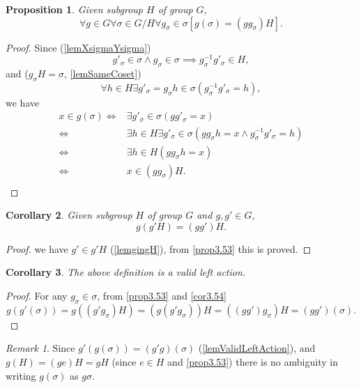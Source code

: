 \documentclass[12pt, letterpaper]{article}
\newtheorem{prop}{Proposition}[section]
\newtheorem{cor}[prop]{Corollary}
\theoremstyle{definition}
\theoremstyle{remark}
\newtheorem*{rem*}{Remark}
\theoremstyle{definition}
\theoremstyle{plain}
\numberwithin{equation}{section}
\begin{document}
	\begin{prop}\label{prop3.53}
		Given subgroup $H$ of group $G$,
		\[\forall g\in G\forall \sigma \in G/H\forall g_\sigma\in\sigma[ g(\sigma)= (gg_{\sigma})H].\]
	\end{prop}
	\begin{proof}
		Since (\autoref{lemXsigmaYsigma})
		\[g'_\sigma\in\sigma\land g_\sigma\in\sigma \implies g_\sigma^{-1}g'_\sigma\in H, \]
		and ($g_\sigma H=\sigma$, \autoref{lemSameCoset})
		\[ \forall h \in H \exists g'_\sigma=g_\sigma h\in \sigma (g^{-1}_\sigma g'_\sigma=h),\]
		we have
		\[\begin{aligned}
			x\in g(\sigma)\iff &\exists g'_\sigma\in\sigma(gg'_\sigma=x)\\
			\iff& \exists h\in H\exists g'_\sigma\in\sigma(gg_\sigma h=x\land g_\sigma^{-1}g'_\sigma=h)\\
			\iff &\exists h\in H(gg_\sigma h=x)\\
			\iff& x\in(gg_\sigma)H.\\
		\end{aligned}
		\]
	\end{proof}
	\begin{cor}\label{cor3.54}
		Given subgroup $H$ of group $G$ and $g,g'\in G$,
		\[g(g'H)=(gg')H.\]
	\end{cor}
	\begin{proof}
		we have $g'\in g'H$ (\autoref{lemgingH}), from \autoref{prop3.53} this is proved.
	\end{proof}
	\begin{cor}\label{lemValidLeftAction}
		The above definition is a valid left action.
	\end{cor}
	\begin{proof}
		For any $g_\sigma\in\sigma$,
		 from \autoref{prop3.53} and \autoref{cor3.54}
		\[g(g'(\sigma))=g((g'g_\sigma)H)=(g(g'g_\sigma))H=((gg')g_\sigma)H=(gg')(\sigma).\]
	\end{proof}
	\begin{rem*}\label{rem_g_sigma}
		Since  $g'(g(\sigma))=(g'g)(\sigma)$ (\autoref{lemValidLeftAction}),
		and $g(H)=(ge)H=gH$ (since $e\in H$ and \autoref{prop3.53})
		there is no ambiguity
		in writing $g(\sigma)$ as $g\sigma$.
	\end{rem*}
\end{document}
